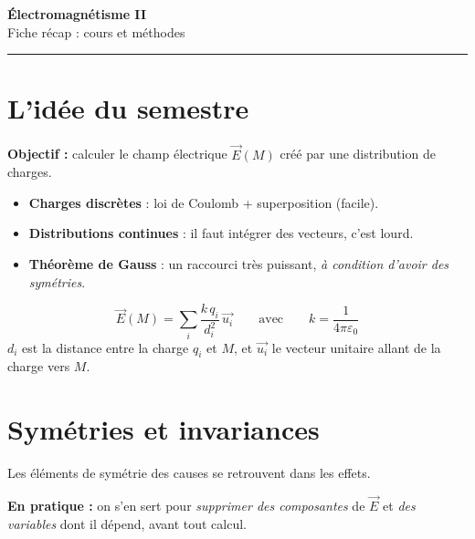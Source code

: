 \documentclass[11pt,a4paper]{article}
\newcommand{\vect}[1]{\overrightarrow{#1}}
\newcommand{\E}{\vect{E}}
\newcommand{\eps}{\varepsilon_0}
\begin{document}
\begin{center}
  {\Huge\bfseries\color{rosevif} Électromagnétisme II}\\[8pt]
  {\Large\color{prune} Fiche récap : cours et méthodes}\\[4pt]
  {\color{rosemoyen}\rule{0.6\textwidth}{1.5pt}}
\end{center}

\vspace{10pt}

\section{L'idée du semestre}

\begin{idee}
\textbf{Objectif :} calculer le champ électrique $\E(M)$ créé par une distribution de charges.

\medskip
\begin{itemize}
  \item \textbf{Charges discrètes} : loi de Coulomb + superposition (facile).
  \item \textbf{Distributions continues} : il faut intégrer des vecteurs, c'est lourd.
  \item \textbf{Théorème de Gauss} : un raccourci très puissant, \emph{à condition d'avoir des symétries}.
\end{itemize}
\end{idee}

\begin{formule}
\[
\E(M)=\sum_i \frac{k\,q_i}{d_i^{2}}\,\vect{u_i}
\qquad\text{avec}\qquad k=\frac{1}{4\pi\eps}
\]
$d_i$ est la distance entre la charge $q_i$ et $M$, et $\vect{u_i}$ le vecteur unitaire allant de la charge vers $M$.
\end{formule}

\section{Symétries et invariances}

\begin{idee}
Les éléments de symétrie des causes se retrouvent dans les effets.

\medskip
\textbf{En pratique :} on s'en sert pour \emph{supprimer des composantes} de $\E$ et \emph{des variables} dont il dépend, avant tout calcul.
\end{idee}
\end{document}

